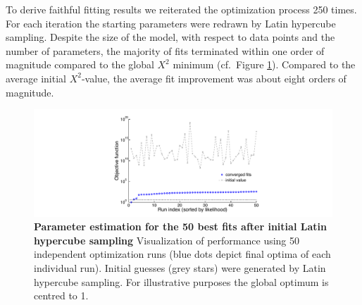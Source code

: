 To derive faithful fitting results we reiterated the optimization process 250 times. For each iteration the starting parameters were redrawn by Latin hypercube sampling. Despite the size of the model, with respect to data points and the number of parameters, the majority of fits terminated within one order of magnitude compared to the global $X^2$ minimum (cf.\ Figure \ref{fig:LHS}). Compared to the average initial $X^2$-value, the average fit improvement was about eight orders of magnitude.
\begin{figure}[b!]
	\begin{center}
		\includegraphics[width=1\textwidth]{Abbildungen/figure2_6_4.pdf}
		\caption{\textbf{Parameter estimation for the 50 best fits after initial Latin hypercube sampling} Visualization of performance using 50 independent optimization runs (blue dots depict final optima of each individual run). Initial guesses (grey stars) were generated by Latin hypercube sampling. For illustrative purposes the global optimum is centred to 1.}
		\label{fig:LHS}
	\end{center}
\end{figure} 
